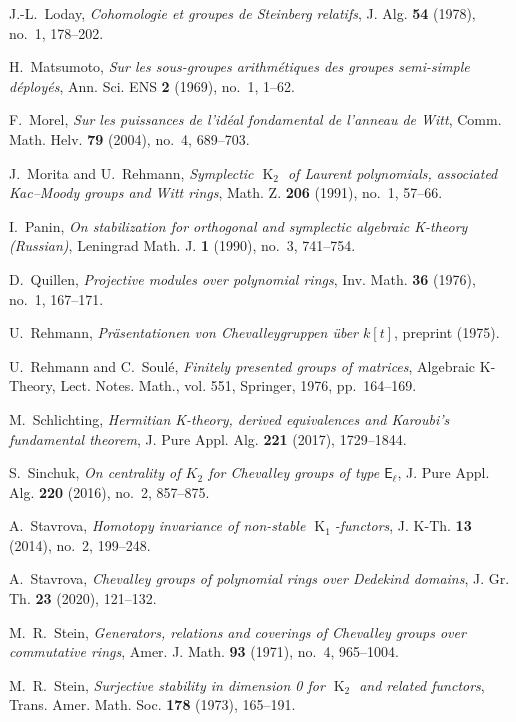 \documentclass[10pt,a4paper,twoside]{article}
\theoremstyle{remark}
\theoremstyle{definition}
\numberwithin{lemma}{section}
\numberwithin{prop}{section}
\numberwithin{corollary}{section}
\numberwithin{externaltheorem}{section}
\DeclareMathOperator{\K}{K}
\numberwithin{equation}{section}
\begin{document}
\begin{thebibliography}{1000}
 J.-L.~Loday,
 \emph{Cohomologie et groupes de Steinberg relatifs}, 
 J. Alg. \textbf{54} (1978), no.~1, 178--202.

 H.~Matsumoto,
 \emph{Sur les sous-groupes arithm{\'e}tiques des groupes semi-simple d{\'e}ploy{\'e}s},
 Ann. Sci. ENS \textbf{2} (1969), no.~1, 1--62.

 F.~Morel,
 \emph{Sur les puissances de l'id{\'e}al fondamental de l'anneau de Witt},
 Comm. Math. Helv. \textbf{79} (2004), no.~4, 689--703.

 J.~Morita and U.~Rehmann,
 \emph{Symplectic $\K_2$ of Laurent polynomials, associated Kac--Moody groups and Witt rings},
 Math. Z. \textbf{206} (1991), no.~1, 57--66.

 I.~Panin, 
 \emph{On stabilization for orthogonal and symplectic algebraic K-theory (Russian)},
 Leningrad Math. J. \textbf{1} (1990), no.~3, 741--754.

 D.~Quillen, 
 \emph{Projective modules over polynomial rings},
 Inv. Math. \textbf{36} (1976), no.~1, 167--171.

 U.~Rehmann, 
 \emph{Pr{\"a}sentationen von Chevalleygruppen {\"u}ber $k[t]$}, preprint (1975).

 U.~Rehmann and C.~Soul{\'e},
 \emph{Finitely presented groups of matrices}, 
 Algebraic K-Theory, Lect. Notes. Math., vol. 551, Springer, 1976, pp.~164--169.

 M.~Schlichting, 
 \emph{Hermitian K-theory, derived equivalences and Karoubi's fundamental theorem},
 J. Pure Appl. Alg. \textbf{221} (2017), 1729--1844.

 S.~Sinchuk, 
 \emph{On centrality of $K_2$ for Chevalley groups of type $\mathsf{E}_\ell$},
 J. Pure Appl. Alg. \textbf{220} (2016), no.~2, 857--875.

 A.~Stavrova, 
 \emph{Homotopy invariance of non-stable $\K_1$-functors}, 
 J. K-Th. \textbf{13} (2014), no.~2, 199--248.

 A.~Stavrova, 
 \emph{Chevalley groups of polynomial rings over Dedekind domains}, 
 J. Gr. Th. \textbf{23} (2020), 121--132.

 M.~R.~Stein, 
 \emph{Generators, relations and coverings of Chevalley groups over commutative rings},
 Amer. J. Math. \textbf{93} (1971), no.~4, 965--1004.

 M.~R.~Stein, 
 \emph{Surjective stability in dimension 0 for $\K_2$ and related functors},
 Trans. Amer. Math. Soc. \textbf{178} (1973), 165--191.


\end{thebibliography}
\end{document}

